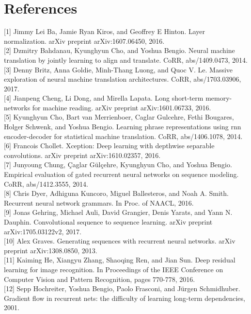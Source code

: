 \documentclass[10pt]{article}
\begin{document}
\section*{References}
[1] Jimmy Lei Ba, Jamie Ryan Kiros, and Geoffrey E Hinton. Layer normalization. arXiv preprint arXiv:1607.06450, 2016.\\[0pt]
[2] Dzmitry Bahdanau, Kyunghyun Cho, and Yoshua Bengio. Neural machine translation by jointly learning to align and translate. CoRR, abs/1409.0473, 2014.\\[0pt]
[3] Denny Britz, Anna Goldie, Minh-Thang Luong, and Quoc V. Le. Massive exploration of neural machine translation architectures. CoRR, abs/1703.03906, 2017.\\[0pt]
[4] Jianpeng Cheng, Li Dong, and Mirella Lapata. Long short-term memory-networks for machine reading. arXiv preprint arXiv:1601.06733, 2016.\\[0pt]
[5] Kyunghyun Cho, Bart van Merrienboer, Caglar Gulcehre, Fethi Bougares, Holger Schwenk, and Yoshua Bengio. Learning phrase representations using rnn encoder-decoder for statistical machine translation. CoRR, abs/1406.1078, 2014.\\[0pt]
[6] Francois Chollet. Xception: Deep learning with depthwise separable convolutions. arXiv preprint arXiv:1610.02357, 2016.\\[0pt]
[7] Junyoung Chung, Çaglar Gülçehre, Kyunghyun Cho, and Yoshua Bengio. Empirical evaluation of gated recurrent neural networks on sequence modeling. CoRR, abs/1412.3555, 2014.\\[0pt]
[8] Chris Dyer, Adhiguna Kuncoro, Miguel Ballesteros, and Noah A. Smith. Recurrent neural network grammars. In Proc. of NAACL, 2016.\\[0pt]
[9] Jonas Gehring, Michael Auli, David Grangier, Denis Yarats, and Yann N. Dauphin. Convolutional sequence to sequence learning. arXiv preprint arXiv:1705.03122v2, 2017.\\[0pt]
[10] Alex Graves. Generating sequences with recurrent neural networks. arXiv preprint arXiv:1308.0850, 2013.\\[0pt]
[11] Kaiming He, Xiangyu Zhang, Shaoqing Ren, and Jian Sun. Deep residual learning for image recognition. In Proceedings of the IEEE Conference on Computer Vision and Pattern Recognition, pages 770-778, 2016.\\[0pt]
[12] Sepp Hochreiter, Yoshua Bengio, Paolo Frasconi, and Jürgen Schmidhuber. Gradient flow in recurrent nets: the difficulty of learning long-term dependencies, 2001.\\[0pt]
\end{document}
